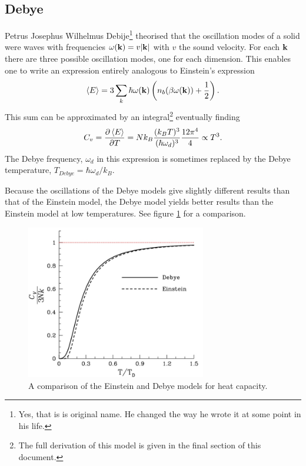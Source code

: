 \documentclass[11pt]{amsart}
\begin{document}
\subsection{Debye}
Petrus Josephus Wilhelmus Debije\footnote{Yes, that is is original name. He changed the way he wrote it at some point in his life.} theorised that the oscillation modes of a solid were waves with frequencies $\omega(\vb{k}) = v\abs{\vb{k}}$ with $v$ the sound velocity. For each $\vb{k}$ there are three possible oscillation modes, one for each dimension. This enables one to write an expression entirely analogous to Einstein's expression
\begin{equation}
\label{eq:debyestart}
\ev{E} = 3\sum_k\hbar\omega(\vb{k})\left(n_b(\beta\omega(\vb{k}))+\frac{1}{2}\right).
\end{equation}
This sum can be approximated by an integral\footnote{The full derivation of this model is given in the final section of this document.} eventually finding
\begin{equation}
C_v = \frac{\partial\ev{E}}{\partial T} = Nk_B \frac{(k_B T)^3}{(\hbar\omega_d)^3}\frac{12\pi^4}{4} \propto T^3.
\end{equation}
The Debye frequency, $\omega_d$ in this expression is sometimes replaced by the Debye temperature, $T_{Debye} = \hbar\omega_d/k_B$.

Because the oscillations of the Debye models give slightly different results than that of the Einstein model, the Debye model yields better results than the Einstein model at low temperatures. See figure \ref{fig:debyeVSEinstein} for a comparison.

\begin{figure}
\centering
	\includegraphics[width = 0.7\textwidth]{DebyeVSEinstein.jpg}
	\caption{A comparison of the Einstein and Debye models for heat capacity.}
	\label{fig:debyeVSEinstein}
\end{figure}
\end{document}
